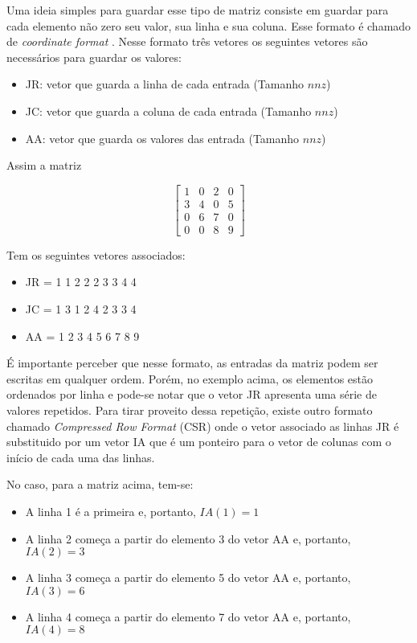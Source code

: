 Uma ideia simples para guardar esse tipo de matriz consiste em guardar para cada elemento não zero seu valor, sua linha e sua coluna. Esse formato é chamado de \textit{coordinate format} \cite{solverlinear}. Nesse formato três vetores os seguintes vetores são necessários para guardar os valores:

\begin{itemize}
    \item JR: vetor que guarda a linha de cada entrada (Tamanho $nnz$)
    \item JC: vetor que guarda a coluna de cada entrada (Tamanho $nnz$)
    \item AA: vetor que guarda os valores das entrada (Tamanho $nnz$)
\end{itemize}


Assim a matriz

\begin{equation}
    \begin{bmatrix}
        1 & 0 & 2 & 0\\ 
        3 & 4 & 0 & 5\\ 
        0 & 6 & 7 & 0\\ 
        0 & 0 & 8 &9 
    \end{bmatrix}
\end{equation}

Tem os seguintes vetores associados:

\begin{center}
    \begin{itemize}
        \item JR = 1 1 2 2 2 3 3 4 4
        \item JC = 1 3 1 2 4 2 3 3 4
        \item AA = 1 2 3 4 5 6 7 8 9
    \end{itemize}
\end{center}

É importante perceber que nesse formato, as entradas da matriz podem ser escritas em qualquer ordem. Porém, no exemplo acima, os elementos estão ordenados por linha e pode-se notar que o vetor JR apresenta uma série de valores repetidos. Para tirar proveito dessa repetição, existe outro formato chamado \textit{Compressed Row Format} (CSR) onde o vetor associado as linhas JR é substituido por um vetor IA que é um ponteiro para o vetor de colunas com o início de cada uma das linhas.

No caso, para a matriz acima, tem-se:

\begin{itemize}
    \item A linha 1 é a primeira e, portanto, $IA(1) = 1$
    \item A linha 2 começa a partir do elemento 3 do vetor AA e, portanto, $IA(2) = 3$
    \item A linha 3 começa a partir do elemento 5 do vetor AA e, portanto, $IA(3) = 6$
    \item A linha 4 começa a partir do elemento 7 do vetor AA e, portanto, $IA(4) = 8$
\end{itemize}


